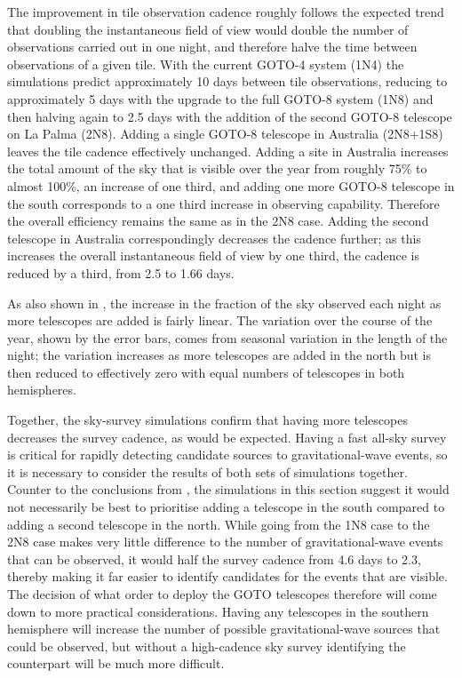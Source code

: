 \begin{colsection}
The improvement in tile observation cadence roughly follows the expected trend that doubling the instantaneous field of view would double the number of observations carried out in one night, and therefore halve the time between observations of a given tile. With the current GOTO-4 system (1N4) the simulations predict approximately 10 days between tile observations, reducing to approximately 5 days with the upgrade to the full GOTO-8 system (1N8) and then halving again to 2.5 days with the addition of the second GOTO-8 telescope on La Palma (2N8). Adding a single GOTO-8 telescope in Australia (2N8+1S8) leaves the tile cadence effectively unchanged. Adding a site in Australia increases the total amount of the sky that is visible over the year from roughly 75\% to almost 100\%, an increase of one third, and adding one more GOTO-8 telescope in the south corresponds to a one third increase in observing capability. Therefore the overall efficiency remains the same as in the 2N8 case. Adding the second telescope in Australia correspondingly decreases the cadence further; as this increases the overall instantaneous field of view by one third, the cadence is reduced by a third, from 2.5 to 1.66 days.

As also shown in , the increase in the fraction of the sky observed each night as more telescopes are added is fairly linear. The variation over the course of the year, shown by the error bars, comes from seasonal variation in the length of the night; the variation increases as more telescopes are added in the north but is then reduced to effectively zero with equal numbers of telescopes in both hemispheres.

Together, the sky-survey simulations confirm that having more telescopes decreases the survey cadence, as would be expected. Having a fast all-sky survey is critical for rapidly detecting candidate sources to gravitational-wave events, so it is necessary to consider the results of both sets of simulations together. Counter to the conclusions from , the simulations in this section suggest it would not necessarily be best to prioritise adding a telescope in the south compared to adding a second telescope in the north. While going from the 1N8 case to the 2N8 case makes very little difference to the number of gravitational-wave events that can be observed, it would half the survey cadence from 4.6 days to 2.3, thereby making it far easier to identify candidates for the events that are visible. The decision of what order to deploy the GOTO telescopes therefore will come down to more practical considerations. Having any telescopes in the southern hemisphere will increase the number of possible gravitational-wave sources that could be observed, but without a high-cadence sky survey identifying the counterpart will be much more difficult.


\end{colsection}
